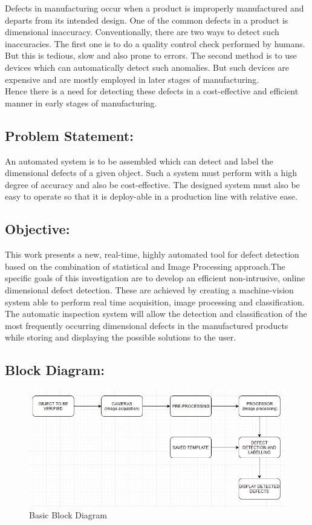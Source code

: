 \documentclass[14pt]{extarticle}
\begin{document}
{\quad}Defects in manufacturing occur when a product is improperly manufactured and departs from its intended design. One of the common defects in a product is dimensional inaccuracy. Conventionally, there are two ways to detect such inaccuracies. The first one is to do a quality control check performed by humans. But this is tedious, slow and also prone to errors. The second method is to use devices which can automatically detect such anomalies. But such devices are expensive and are mostly employed in later stages of manufacturing.\\

{\quad}Hence there is a need for detecting these defects in a cost-effective and efficient manner in early stages of manufacturing.


\subsection{Problem Statement:}
{\quad}An automated system is to be assembled which can detect and label the dimensional defects of a given object. Such a system must  perform with a high degree of accuracy and also be cost-effective. The designed system must also be easy to operate so that it is deploy-able in a production line with relative ease.

\subsection{Objective:}
{\quad}This work presents a new, real-time, highly automated tool for defect detection based on the combination of statistical and Image Processing approach.The specific goals of this investigation are to develop an efficient non-intrusive, online dimensional defect detection. These are achieved by creating a machine-vision system able to perform real time acquisition,  image processing and classification. The automatic inspection system will allow the detection and classification of the most frequently occurring dimensional defects in the manufactured products while storing and displaying the possible solutions to the user.

\subsection{Block Diagram:}

\begin{figure}[h]
\includegraphics[scale=1]{bd.jpg}
\caption{Basic Block Diagram}
\end{figure}
\end{document}
